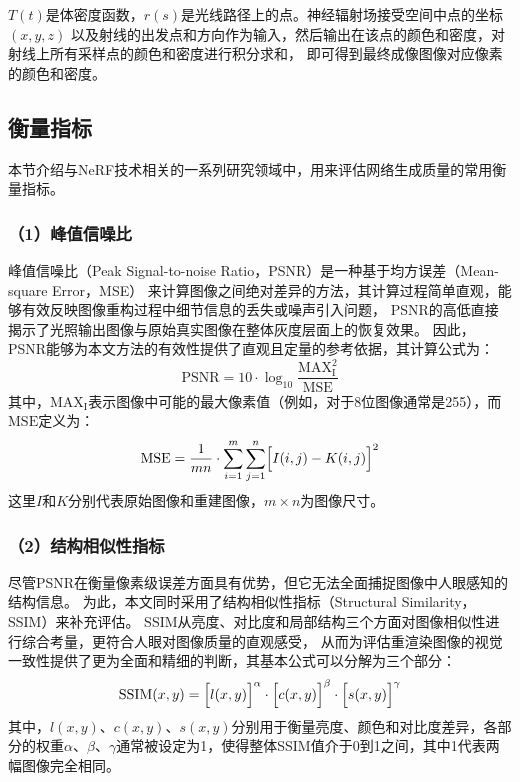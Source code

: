 $T\left(t\right)$是体密度函数，$r\left(s\right)$是光线路径上的点。神经辐射场接受空间中点的坐标$\left(x,y,z\right)$
以及射线的出发点和方向作为输入，然后输出在该点的颜色和密度，对射线上所有采样点的颜色和密度进行积分求和，
即可得到最终成像图像对应像素的颜色和密度。

\subsection{衡量指标}

本节介绍与NeRF技术相关的一系列研究领域中，用来评估网络生成质量的常用衡量指标。

\subsubsection*{（1）峰值信噪比} 

峰值信噪比（Peak Signal-to-noise Ratio，PSNR）是一种基于均方误差（Mean-square Error，MSE）
来计算图像之间绝对差异的方法，其计算过程简单直观，能够有效反映图像重构过程中细节信息的丢失或噪声引入问题，
PSNR的高低直接揭示了光照输出图像与原始真实图像在整体灰度层面上的恢复效果。
因此，PSNR能够为本文方法的有效性提供了直观且定量的参考依据，其计算公式为：
\begin{equation}\label{eq:PSNR}
\mathrm{PSNR}=10\cdot\log_{10}\frac{\mathrm{MAX}_\mathrm{I}^2}{\mathrm{MSE}}
\end{equation}
其中，$\mathrm{MAX}_\mathrm{I}$表示图像中可能的最大像素值（例如，对于8位图像通常是255），而$\mathrm{MSE}$定义为：
\begin{equation}\label{eq:MSE}
\mathrm{MSE}=\frac{1}{mn}\cdot\sum_{i=1}^{m}\sum_{j=1}^{n}\Bigl[I(i,j)-K(i,j)\Bigr]^2
\end{equation}
这里$I$和$K$分别代表原始图像和重建图像，$m\times n$为图像尺寸。

\subsubsection*{（2）结构相似性指标} 

尽管PSNR在衡量像素级误差方面具有优势，但它无法全面捕捉图像中人眼感知的结构信息。
为此，本文同时采用了结构相似性指标（Structural Similarity，SSIM）来补充评估。
SSIM从亮度、对比度和局部结构三个方面对图像相似性进行综合考量，更符合人眼对图像质量的直观感受，
从而为评估重渲染图像的视觉一致性提供了更为全面和精细的判断，其基本公式可以分解为三个部分：
\begin{equation}\label{eq:SSIM}
\mathrm{SSIM}(x,y)=\Bigl[l(x,y)\Bigr]^\alpha\cdot\Bigl[c(x,y)\Bigr]^\beta\cdot\Bigl[s(x,y)\Bigr]^\gamma
\end{equation}
其中，$l(x,y)$、$c(x,y)$、$s(x,y)$分别用于衡量亮度、颜色和对比度差异，各部分的权重$\alpha$、$\beta$、$\gamma$通常被设定为1，使得整体SSIM值介于0到1之间，其中1代表两幅图像完全相同。

